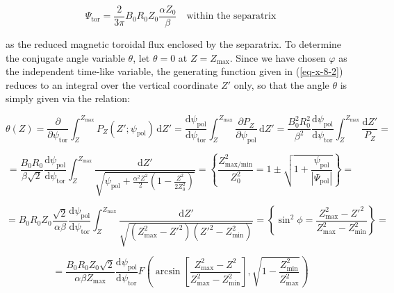 \begin{enumerate}
    \begin{equation}
        \Psi_\text{tor}=\frac{2}{3\pi}B_0R_0Z_0\frac{\alpha Z_0}{\beta}\quad\text{within the separatrix}
    \end{equation}

    as the reduced magnetic toroidal flux enclosed by the separatrix. To determine the conjugate angle variable $\theta$, let $\theta=0$ at $Z=Z_\text{max}$. Since we have chosen $\varphi$ as the independent time-like variable, the generating function given in (\ref{eq-x-8-2}) reduces to an integral over the vertical coordinate $Z'$ only, so that the angle $\theta$ is simply given via the relation:

    \begin{equation*}
        \theta(Z)=\frac{\partial}{\partial\psi_\text{tor}}\int_Z^{Z_\text{max}}P_Z(Z';\psi_\text{pol})\,\mathrm{d}Z'=\frac{\mathrm{d}\psi_\text{pol}}{\mathrm{d}\psi_\text{tor}}\int_Z^{Z_\text{max}}\frac{\partial P_Z}{\partial\psi_\text{pol}}\,\mathrm{d}Z'=\frac{B_0^2R_0^2}{\beta^2}\frac{\mathrm{d}\psi_\text{pol}}{\mathrm{d}\psi_\text{tor}}\int_Z^{Z_\text{max}}\frac{\mathrm{d}Z'}{P_Z}=
    \end{equation*}

    \begin{equation*}
        =\frac{B_0R_0}{\beta\sqrt{2}}\frac{\mathrm{d}\psi_\text{pol}}{\mathrm{d}\psi_\text{tor}}\int_Z^{Z_\text{max}}\frac{\mathrm{d}Z'}{\sqrt{\psi_\text{pol}+\frac{\alpha^2Z^2}{2}\left(1-\frac{Z^2}{2Z_0^2}\right)}}=\left\{\frac{Z_\text{max/min}^2}{Z_0^2}=1\pm\sqrt{1+\frac{\psi_\text{pol}}{|\Psi_\text{pol}|}}\right\}=
    \end{equation*}
    
    \begin{equation*}
        ={B_0R_0Z_0}\frac{\sqrt{2}}{\alpha\beta}\frac{\mathrm{d}\psi_\text{pol}}{\mathrm{d}\psi_\text{tor}}\int_Z^{Z_\text{max}}\frac{\mathrm{d}Z'}{\sqrt{(Z_\text{max}^2-Z'^2)(Z'^2-Z_\text{min}^2)}}=\left\{\sin^2{\phi}=\frac{Z_\text{max}^2-Z'^2}{Z_\text{max}^2-Z_\text{min}^2}\right\}=
    \end{equation*}
    
    \begin{equation}
        \label{eq-5-212}
        =\frac{B_0R_0Z_0\sqrt{2}}{\alpha\beta Z_\text{max}}\frac{\mathrm{d}\psi_\text{pol}}{\mathrm{d}\psi_\text{tor}}F\left(\arcsin{\left[\frac{Z_\text{max}^2-Z^2}{Z_\text{max}^2-Z_\text{min}^2}\right],\sqrt{1-\frac{Z_\text{min}^2}{Z_\text{max}^2}}}\right)
    \end{equation}


\end{enumerate}
